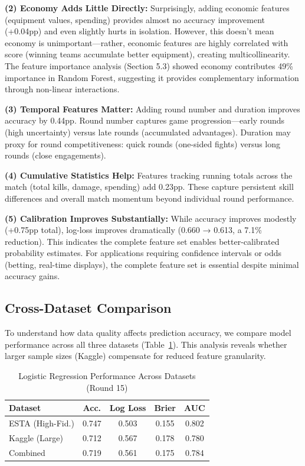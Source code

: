 \documentclass[10pt,twocolumn]{article}
\begin{document}
\textbf{(2) Economy Adds Little Directly:} Surprisingly, adding economic features (equipment values, spending) provides almost no accuracy improvement (+0.04pp) and even slightly hurts in isolation. However, this doesn't mean economy is unimportant—rather, economic features are highly correlated with score (winning teams accumulate better equipment), creating multicollinearity. The feature importance analysis (Section 5.3) showed economy contributes 49\% importance in Random Forest, suggesting it provides complementary information through non-linear interactions.

\textbf{(3) Temporal Features Matter:} Adding round number and duration improves accuracy by 0.44pp. Round number captures game progression—early rounds (high uncertainty) versus late rounds (accumulated advantages). Duration may proxy for round competitiveness: quick rounds (one-sided fights) versus long rounds (close engagements).

\textbf{(4) Cumulative Statistics Help:} Features tracking running totals across the match (total kills, damage, spending) add 0.23pp. These capture persistent skill differences and overall match momentum beyond individual round performance.

\textbf{(5) Calibration Improves Substantially:} While accuracy improves modestly (+0.75pp total), log-loss improves dramatically (0.660 → 0.613, a 7.1\% reduction). This indicates the complete feature set enables better-calibrated probability estimates. For applications requiring confidence intervals or odds (betting, real-time displays), the complete feature set is essential despite minimal accuracy gains.

\subsection{Cross-Dataset Comparison}

To understand how data quality affects prediction accuracy, we compare model performance across all three datasets (Table~\ref{tab:cross_dataset}). This analysis reveals whether larger sample sizes (Kaggle) compensate for reduced feature granularity.

\begin{table}[h]
\centering
\caption{Logistic Regression Performance Across Datasets (Round 15)}
\label{tab:cross_dataset}
\scriptsize
\setlength{\tabcolsep}{2.5pt}
\begin{tabular}{lcccc}
\toprule
\textbf{Dataset} & \textbf{Acc.} & \textbf{Log Loss} & \textbf{Brier} & \textbf{AUC} \\
\midrule
ESTA (High-Fid.) & 0.747 & 0.503 & 0.155 & 0.802 \\
Kaggle (Large) & 0.712 & 0.567 & 0.178 & 0.780 \\
Combined & 0.719 & 0.561 & 0.175 & 0.784 \\
\bottomrule
\end{tabular}
\end{table}
\end{document}
